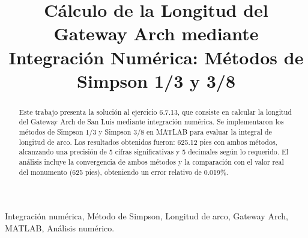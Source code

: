 \documentclass[conference]{IEEEtran}
\begin{document}
\title{Cálculo de la Longitud del Gateway Arch mediante Integración Numérica: Métodos de Simpson 1/3 y 3/8}

\author{
\and
{}
\and
{}
\and
\IEEEauthorblockN{}
\IEEEauthorblockA{}
\and
{}
\and
\IEEEauthorblockN{}
\IEEEauthorblockA{}
}

\maketitle

\begin{abstract}
Este trabajo presenta la solución al ejercicio 6.7.13, que consiste en calcular la longitud del Gateway Arch de San Luis mediante integración numérica. Se implementaron los métodos de Simpson 1/3 y Simpson 3/8 en MATLAB para evaluar la integral de longitud de arco. Los resultados obtenidos fueron: 625.12 pies con ambos métodos, alcanzando una precisión de 5 cifras significativas y 5 decimales según lo requerido. El análisis incluye la convergencia de ambos métodos y la comparación con el valor real del monumento (625 pies), obteniendo un error relativo de 0.019\%.
\end{abstract}

\begin{IEEEkeywords}
Integración numérica, Método de Simpson, Longitud de arco, Gateway Arch, MATLAB, Análisis numérico.
\end{IEEEkeywords}
\end{document}
